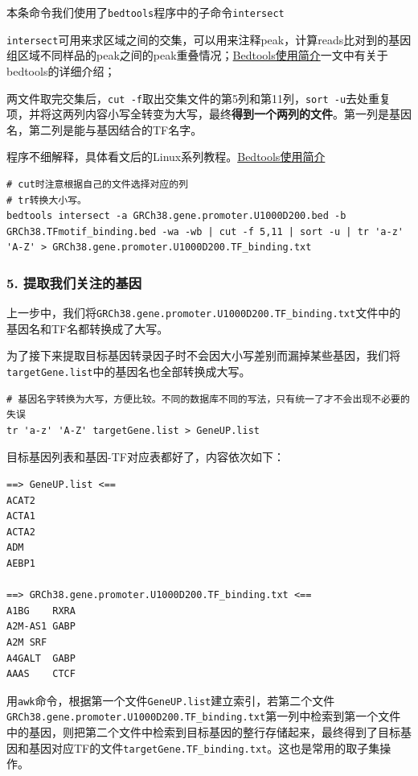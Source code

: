 \documentclass[]{article}
\numberwithin{figure}{section}
\numberwithin{table}{section}
\begin{document}
本条命令我们使用了\texttt{bedtools}程序中的子命令\texttt{intersect}

\texttt{intersect}可用来求区域之间的交集，可以用来注释peak，计算reads比对到的基因组区域不同样品的peak之间的peak重叠情况；\href{https://mp.weixin.qq.com/s/bIXom5bSDov-4sPqsTRc6A}{Bedtools使用简介}一文中有关于bedtools的详细介绍；

两文件取完交集后，\texttt{cut\ -f}取出交集文件的第5列和第11列，\texttt{sort\ -u}去处重复项，并将这两列内容小写全转变为大写，最终\textbf{得到一个两列的文件}。第一列是基因名，第二列是能与基因结合的TF名字。

程序不细解释，具体看文后的Linux系列教程。\href{https://mp.weixin.qq.com/s/bIXom5bSDov-4sPqsTRc6A}{Bedtools使用简介}

\begin{verbatim}
# cut时注意根据自己的文件选择对应的列
# tr转换大小写。
bedtools intersect -a GRCh38.gene.promoter.U1000D200.bed -b GRCh38.TFmotif_binding.bed -wa -wb | cut -f 5,11 | sort -u | tr 'a-z' 'A-Z' > GRCh38.gene.promoter.U1000D200.TF_binding.txt
\end{verbatim}

\hypertarget{biomart_motif_9}{%
\subsubsection{5. 提取我们关注的基因}\label{biomart_motif_9}}

上一步中，我们将\texttt{GRCh38.gene.promoter.U1000D200.TF\_binding.txt}文件中的基因名和TF名都转换成了大写。

为了接下来提取目标基因转录因子时不会因大小写差别而漏掉某些基因，我们将\texttt{targetGene.list}中的基因名也全部转换成大写。

\begin{verbatim}
# 基因名字转换为大写，方便比较。不同的数据库不同的写法，只有统一了才不会出现不必要的失误
tr 'a-z' 'A-Z' targetGene.list > GeneUP.list
\end{verbatim}

目标基因列表和基因-TF对应表都好了，内容依次如下：

\begin{verbatim}
==> GeneUP.list <==
ACAT2
ACTA1
ACTA2
ADM
AEBP1

==> GRCh38.gene.promoter.U1000D200.TF_binding.txt <==
A1BG	RXRA
A2M-AS1	GABP
A2M	SRF
A4GALT	GABP
AAAS	CTCF
\end{verbatim}

用\texttt{awk}命令，根据第一个文件\texttt{GeneUP.list}建立索引，若第二个文件\texttt{GRCh38.gene.promoter.U1000D200.TF\_binding.txt}第一列中检索到第一个文件中的基因，则把第二个文件中检索到目标基因的整行存储起来，最终得到了目标基因和基因对应TF的文件\texttt{targetGene.TF\_binding.txt}。这也是常用的取子集操作。
\end{document}
